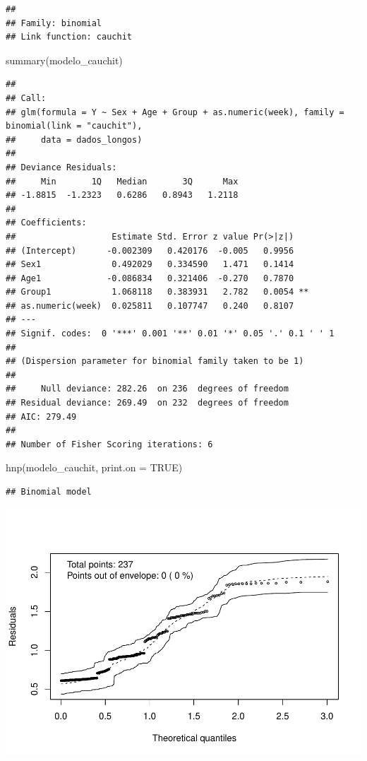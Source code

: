 \documentclass[
]{article}
\newenvironment{Shaded}{\begin{snugshade}}{\end{snugshade}}
\newcommand{\AttributeTok}[1]{\textcolor[rgb]{0.77,0.63,0.00}{#1}}
\newcommand{\ConstantTok}[1]{\textcolor[rgb]{0.00,0.00,0.00}{#1}}
\newcommand{\FunctionTok}[1]{\textcolor[rgb]{0.00,0.00,0.00}{#1}}
\newcommand{\NormalTok}[1]{#1}
\begin{document}
\begin{verbatim}
## 
## Family: binomial 
## Link function: cauchit
\end{verbatim}

\begin{Shaded}
\begin{Highlighting}[]
\FunctionTok{summary}\NormalTok{(modelo\_cauchit)}
\end{Highlighting}
\end{Shaded}

\begin{verbatim}
## 
## Call:
## glm(formula = Y ~ Sex + Age + Group + as.numeric(week), family = binomial(link = "cauchit"), 
##     data = dados_longos)
## 
## Deviance Residuals: 
##     Min       1Q   Median       3Q      Max  
## -1.8815  -1.2323   0.6286   0.8943   1.2118  
## 
## Coefficients:
##                   Estimate Std. Error z value Pr(>|z|)   
## (Intercept)      -0.002309   0.420176  -0.005   0.9956   
## Sex1              0.492029   0.334590   1.471   0.1414   
## Age1             -0.086834   0.321406  -0.270   0.7870   
## Group1            1.068118   0.383931   2.782   0.0054 **
## as.numeric(week)  0.025811   0.107747   0.240   0.8107   
## ---
## Signif. codes:  0 '***' 0.001 '**' 0.01 '*' 0.05 '.' 0.1 ' ' 1
## 
## (Dispersion parameter for binomial family taken to be 1)
## 
##     Null deviance: 282.26  on 236  degrees of freedom
## Residual deviance: 269.49  on 232  degrees of freedom
## AIC: 279.49
## 
## Number of Fisher Scoring iterations: 6
\end{verbatim}

\begin{Shaded}
\begin{Highlighting}[]
\FunctionTok{hnp}\NormalTok{(modelo\_cauchit, }\AttributeTok{print.on =} \ConstantTok{TRUE}\NormalTok{)}
\end{Highlighting}
\end{Shaded}

\begin{verbatim}
## Binomial model
\end{verbatim}

\includegraphics{EDA__files/figure-latex/unnamed-chunk-12-1.pdf}
\end{document}
